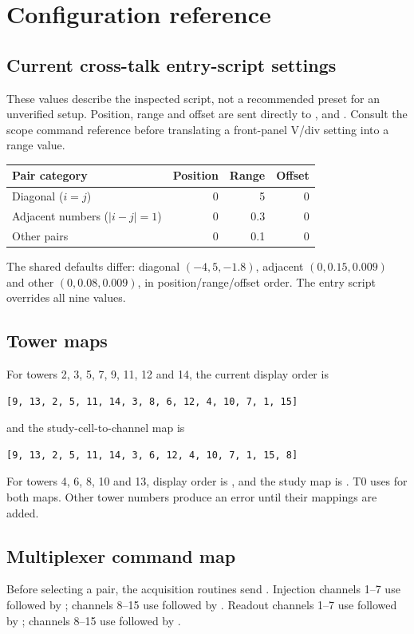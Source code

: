 \section{Configuration reference}
\subsection{Current cross-talk entry-script settings}
These values describe the inspected script, not a recommended preset for an unverified setup. Position, range and offset are sent directly to ,  and . Consult the scope command reference before translating a front-panel V/div setting into a range value.
\begin{center}
\begin{tabular}{@{}lrrr@{}}
\toprule
Pair category & Position & Range & Offset \\
\midrule
Diagonal ($i=j$) & 0 & 5 & 0 \\
Adjacent numbers ($|i-j|=1$) & 0 & 0.3 & 0 \\
Other pairs & 0 & 0.1 & 0 \\
\bottomrule
\end{tabular}
\end{center}
The shared defaults differ: diagonal $(-4,5,-1.8)$, adjacent $(0,0.15,0.009)$ and other $(0,0.08,0.009)$, in position/range/offset order. The entry script overrides all nine values.

\subsection{Tower maps}
\label{sec:tower-maps}
For towers 2, 3, 5, 7, 9, 11, 12 and 14, the current display order is
\begin{lstlisting}
[9, 13, 2, 5, 11, 14, 3, 8, 6, 12, 4, 10, 7, 1, 15]
\end{lstlisting}
and the study-cell-to-channel map is
\begin{lstlisting}
[9, 13, 2, 5, 11, 14, 3, 6, 12, 4, 10, 7, 1, 15, 8]
\end{lstlisting}
For towers 4, 6, 8, 10 and 13, display order is , and the study map is \code{[1:7, 9:15, 8]}. T0 uses  for both maps. Other tower numbers produce an error until their mappings are added.

\subsection{Multiplexer command map}
Before selecting a pair, the acquisition routines send . Injection channels 1--7 use  followed by ; channels 8--15 use  followed by . Readout channels 1--7 use  followed by ; channels 8--15 use  followed by .

